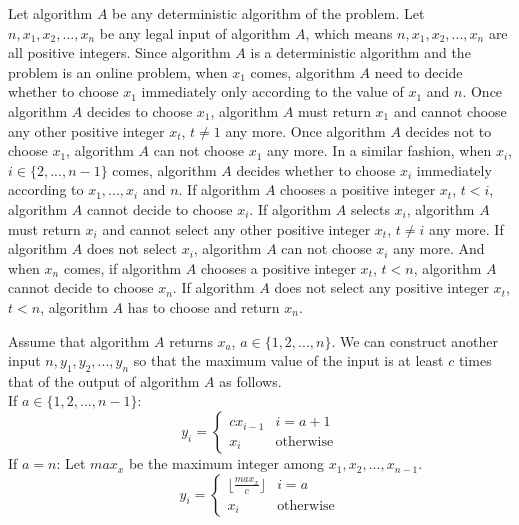 Let algorithm $A$ be any deterministic algorithm of the problem.
Let $n, x_1,x_2,...,x_n$ be any legal input of algorithm $A$, which means $n, x_1, x_2,..., x_n$ are all positive integers.
Since algorithm $A$ is a deterministic algorithm and the problem is an online problem, 
when $x_1$ comes, 
algorithm $A$ need to decide whether to choose $x_1$ immediately only according to the value of $x_1$ and $n$.
Once algorithm $A$ decides to choose $x_1$, algorithm $A$ must return $x_1$ and cannot choose any other positive integer $x_t$, $t\neq 1$ any more.
Once algorithm $A$ decides not to choose $x_1$, algorithm $A$ can not choose $x_1$ any more.
In a similar fashion, when $x_i$, $i\in \{2,...,n-1\}$ comes, algorithm $A$ decides whether to choose $x_i$ immediately according to $x_1,...,x_i$ and $n$.
If algorithm $A$ chooses a positive integer $x_t$, $t<i$, algorithm $A$ cannot decide to choose $x_i$.
If algorithm $A$ selects $x_i$, algorithm $A$ must return $x_i$ and cannot select any other positive integer $x_t$, $t\neq i$ any more.
If algorithm $A$ does not select $x_i$, algorithm $A$ can not choose $x_i$ any more.
And when $x_n$ comes, if algorithm $A$ chooses a positive integer $x_t$, $t<n$, algorithm $A$ cannot decide to choose $x_n$.
If algorithm $A$ does not select any positive integer $x_t$, $t<n$, algorithm $A$ has to choose and return $x_n$.

Assume that algorithm $A$ returns $x_a$, $a\in \{1,2,...,n\}$.
We can construct another input $n, y_1,y_2,...,y_n$ so that the maximum value of the input is at least $c$ times that of the output of algorithm $A$ as follows.\\
If $a\in \{1,2,...,n-1\}$:
\begin{equation}
    \nonumber  y_i=
     \begin{cases}
     cx_{i-1}& i=a+1\\
     x_i& \text{otherwise}
     \end{cases}
 \end{equation}
If $a=n$:
Let $max_x$ be the maximum integer among $x_1,x_2,...,x_{n-1}$.
\begin{equation}
    \nonumber  y_i=
     \begin{cases}
        \lfloor \frac{max_x}{c}\rfloor& i=a\\
     x_i& \text{otherwise}
     \end{cases}
 \end{equation}

